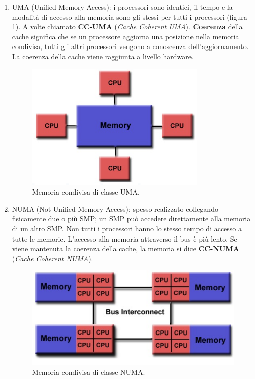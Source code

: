 \begin{enumerate}
	\item UMA (Unified Memory Access): i processori sono identici, il tempo e la modalità di accesso alla memoria sono gli stessi per tutti i processori (figura \ref{fig:uma}). A volte chiamato \textbf{CC-UMA} (\emph{Cache Coherent UMA}). \textbf{Coerenza} della cache significa che se un processore aggiorna una posizione nella memoria condivisa, tutti gli altri processori vengono a conoscenza dell'aggiornamento. La coerenza della cache viene raggiunta a livello hardware.
	\begin{figure}[th]
		\centering
		\includegraphics[width=0.7\linewidth]{img/UMA}
		\caption{Memoria condivisa di classe UMA.}
		\label{fig:uma}
	\end{figure}
	\item NUMA (Not Unified Memory Access): spesso realizzato collegando fisicamente due o più SMP; un SMP può accedere direttamente alla memoria di un altro SMP. Non tutti i processori hanno lo stesso tempo di accesso a tutte le memorie. L'accesso alla memoria attraverso il bus è più lento. Se viene mantenuta la coerenza della cache, la memoria si dice \textbf{CC-NUMA} (\emph{Cache Coherent NUMA}).
	\begin{figure}[th]
		\centering
		\includegraphics[width=0.7\linewidth]{img/NUMA}
		\caption{Memoria condivisa di classe NUMA.}
		\label{fig:numa}
	\end{figure}
\end{enumerate}
